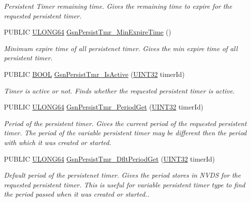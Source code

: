 \begin{DoxyCompactItemize}
\begin{DoxyCompactList}\small\item\em Persistent Timer remaining time. Gives the remaining time to expire for the requested persistent timer. \end{DoxyCompactList}\item 
PUBLIC \hyperlink{a00660_ga28961430434ccabca6862ea93fe9a15b}{ULONG64} \hyperlink{a00671_ga267caddf2e14e33f5b59cd084fbc090a}{GsnPersistTmr\_\-MinExpireTime} ()
\begin{DoxyCompactList}\small\item\em Minimum expire time of all persistenet timer. Gives the min expire time of all persistent timer. \end{DoxyCompactList}\item 
PUBLIC \hyperlink{a00660_ga1f04022c0a182c51c059438790ea138c}{BOOL} \hyperlink{a00671_ga7faefe68a4dfa5d59f0f04e8f4eb4a15}{GsnPersistTmr\_\-IsActive} (\hyperlink{a00660_gae1e6edbbc26d6fbc71a90190d0266018}{UINT32} timerId)
\begin{DoxyCompactList}\small\item\em Timer is active or not. Finds whether the requested persistent timer is active. \end{DoxyCompactList}\item 
PUBLIC \hyperlink{a00660_ga28961430434ccabca6862ea93fe9a15b}{ULONG64} \hyperlink{a00671_ga2acab3c99e8f6bd8a1573c3811092c02}{GsnPersistTmr\_\-PeriodGet} (\hyperlink{a00660_gae1e6edbbc26d6fbc71a90190d0266018}{UINT32} timerId)
\begin{DoxyCompactList}\small\item\em Period of the persistent timer. Gives the current period of the requested persistent timer. The period of the variable persistent timer may be different then the period with which it was created or started. \end{DoxyCompactList}\item 
PUBLIC \hyperlink{a00660_ga28961430434ccabca6862ea93fe9a15b}{ULONG64} \hyperlink{a00671_gae8bc845575767075c35df8096dd08fbc}{GsnPersistTmr\_\-DfltPeriodGet} (\hyperlink{a00660_gae1e6edbbc26d6fbc71a90190d0266018}{UINT32} timerId)
\begin{DoxyCompactList}\small\item\em Default period of the persistenet timer. Gives the period stores in NVDS for the requested persistent timer. This is useful for variable persistent timer type to find the period passed when it was created or started.. \end{DoxyCompactList}\item 

\end{DoxyCompactItemize}

